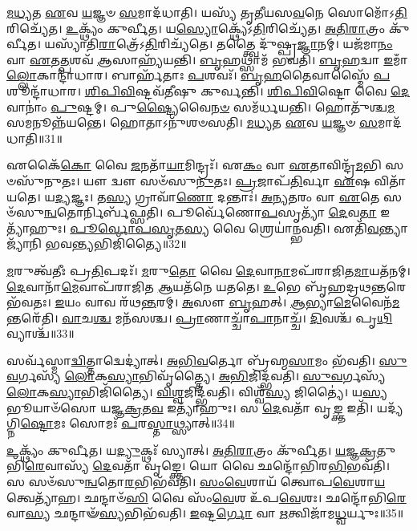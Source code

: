 \-\ul{𑌮}\-\-\ul{𑌧𑍍𑌯}\-𑌤 \ul{𑌏}\-𑌵 \ul{𑌯}\-𑌜𑍍𑌞𑍞 \ul{𑌸}\-𑌮𑌾𑌦᳴𑌧𑌾𑌤𑌿।
𑌯𑌸𑍍𑌯᳴ 𑌤𑍃𑌤𑍀𑌯𑌸\-\ul{𑌵}\-𑌨𑍇 𑌸𑍋𑌮𑍋᳴\-𑌽\-\ul{𑌤𑌿}\-𑌰𑌿𑌚𑍍𑌯𑍇᳴𑌤।
\-\ul{𑌉}\-𑌕𑍍𑌥𑍍𑌯𑌂᳴ 𑌕𑍁𑌰𑍍𑌵𑍀𑌤।
𑌯\-\ul{𑌸𑍍𑌯𑍋}\-𑌕𑍍𑌥𑍍𑌯𑍇᳴\-𑌽\-\ul{𑌤𑌿}\-𑌰𑌿𑌚𑍍𑌯𑍇᳴𑌤।
\-\ul{𑌅}\-\-\ul{𑌤𑌿}\-\-\ul{𑌰𑌾}\-𑌤𑍍𑌰𑌂 𑌕𑍁᳴𑌰𑍍𑌵𑍀𑌤।
𑌯𑌸𑍍𑌯𑌾᳴𑌤𑌿\-\ul{𑌰𑌾}\-𑌤𑍍𑌰𑍇᳴\-𑌽\-\ul{𑌤𑌿}\-𑌰𑌿𑌚𑍍𑌯᳴𑌤𑍇।
𑌤𑌤𑍍𑌤𑍍𑌵𑍈 𑌦𑍁᳴𑌷𑍍𑌪𑍍𑌰\-\ul{𑌜𑍍𑌞𑌾}\-𑌨𑌮𑍍।
𑌯𑌜᳴𑌮𑌾\-\ul{𑌨𑌂} 𑌵𑌾 \ul{𑌏}\-𑌤\-\ul{𑌤𑍍𑌪}\-𑌶𑌵᳴ \ul{𑌆}\-𑌸𑌾𑌹𑍍𑌯᳴𑌯𑌨𑍍𑌤𑌿।
\-\ul{𑌬𑍃}\-𑌹𑌥𑍍𑌸𑌾𑌮᳴ 𑌭𑌵𑌤𑌿।
\-\ul{𑌬𑍃}\-𑌹𑌦𑍍𑌵𑌾 \ul{𑌇}\-𑌮𑌾𑌁\-\ul{𑌲𑍍𑌲𑍋}\-𑌕𑌾𑌨𑍍𑌦𑌾᳴𑌧𑌾𑌰।
𑌬𑌾𑌰𑍍\mbox{}𑌹᳴𑌤𑌾𑌃 \ul{𑌪}\-𑌶𑌵𑌃᳴।
\-\ul{𑌬𑍃}\-\-\ul{𑌹}\-𑌤𑍈𑌵𑌾𑌸𑍍𑌮𑍈᳴ \ul{𑌪}\-𑌶𑍂𑌨𑍍𑌦𑌾᳴𑌧𑌾𑌰।
\-\ul{𑌶𑌿}\-\-\ul{𑌪𑌿}\-\-\ul{𑌵𑌿}\-𑌷𑍍𑌟𑌵᳴𑌤𑍀𑌷𑍁 𑌕𑍁𑌰𑍍𑌵𑌨𑍍𑌤𑌿।
\-\ul{𑌶𑌿}\-\-\ul{𑌪𑌿}\-\-\ul{𑌵𑌿}\-𑌷𑍍𑌟𑍋 𑌵𑍈 \ul{𑌦𑍇}\-𑌵𑌾𑌨𑌾𑌂॑ \ul{𑌪𑍁}\-𑌷𑍍𑌟𑌮𑍍।
𑌪𑍁\-\ul{𑌷𑍍𑌟𑍍𑌯𑍈}\-𑌵𑍈\-\ul{𑌨}\-\-\ul{𑍞} 𑌸𑌮᳴𑌰𑍍𑌧𑌯𑌨𑍍𑌤𑌿।
𑌹𑍋𑌤𑍁᳴𑌶𑍍𑌚\-\ul{𑌮}\-𑌸𑌮𑌨𑍂𑌨𑍍𑌨᳴𑌯𑌨𑍍𑌤𑍇।
𑌹𑍋𑌤𑌾𑌽𑌨𑍁᳴𑌶𑍞𑌸𑌤𑌿।
\-\ul{𑌮}\-\-\ul{𑌧𑍍𑌯}\-𑌤 \ul{𑌏}\-𑌵 \ul{𑌯}\-𑌜𑍍𑌞𑍞 \ul{𑌸}\-𑌮𑌾𑌦᳴𑌧𑌾𑌤𑌿॥31॥\anuvakamend[\-\ul{𑌯}\-\-\ul{𑌨𑍍𑌤𑌿} 𑌸𑌵᳴𑌨𑌸𑍍𑌯𑌾\-\ul{𑌤𑌿}\-𑌰𑌿𑌚𑍍𑌯᳴𑌤𑍇 𑌶𑍞𑌸𑌤𑌿 𑌦𑌾𑌧𑌾\-\ul{𑌰𑌾}\-𑌷𑍍𑌟𑍗 𑌚᳴]

𑌏𑌕𑍈᳴\-\ul{𑌕𑍋} 𑌵𑍈 \ul{𑌜}\-𑌨𑌤𑌾᳴\-\ul{𑌯𑌾}\-𑌮𑌿𑌨𑍍𑌦𑍍𑌰𑌃᳴।
𑌏\-\ul{𑌕𑌂} 𑌵𑌾 \ul{𑌏}\-𑌤𑌾𑌵𑌿𑌨𑍍𑌦𑍍𑌰᳴\-\ul{𑌮}\-𑌭𑌿 𑌸𑍞𑌸𑍁᳴𑌨𑍁𑌤𑌃।
𑌯𑍗 𑌦𑍍𑌵𑍗 𑌸𑍞᳴𑌸𑍁\-\ul{𑌨𑍁}\-𑌤𑌃।
\-\ul{𑌪𑍍𑌰}\-𑌜𑌾𑌪᳴\-\ul{𑌤𑌿}\-𑌰𑍍𑌵𑌾 \ul{𑌏}\-𑌷 𑌵𑌿𑌤𑌾᳴𑌯𑌤𑍇।
𑌯\-\ul{𑌦𑍍𑌯}\-𑌜𑍍𑌞𑌃।
𑌤\-\ul{𑌸𑍍𑌯} 𑌗𑍍𑌰𑌾𑌵𑌾᳴\-\ul{𑌣𑍋} 𑌦𑌨𑍍𑌤𑌾𑌃॑।
\-\ul{𑌅}\-\-\ul{𑌨𑍍𑌯}\-\-\ul{𑌤}\-𑌰𑌂 𑌵𑌾 \ul{𑌏}\-𑌤𑍇 𑌸𑍞᳴𑌸𑍁\-\ul{𑌨𑍍𑌵}\-𑌤𑍋𑌰𑍍𑌨𑌿𑌰𑍍𑌬᳴𑌫𑍍𑌸𑌤𑌿।
𑌪𑍂𑌰𑍍𑌵𑍇᳴𑌣𑍋\-\ul{𑌪}\-𑌸𑍃𑌤𑍍𑌯𑌾᳴ \ul{𑌦𑍇}\-𑌵\-\ul{𑌤𑌾} 𑌇𑌤𑍍𑌯𑌾᳴𑌹𑍁𑌃।
\-\ul{𑌪𑍂}\-\-\ul{𑌰𑍍𑌵𑍋}\-\-\ul{𑌪}\-\-\ul{𑌸𑍃}\-𑌤\-\ul{𑌸𑍍𑌯} 𑌵𑍈 𑌶𑍍𑌰𑍇𑌯𑌾॑𑌨𑍍𑌭𑌵𑌤𑌿।
𑌏𑌤𑌿᳴\-\ul{𑌵}\-𑌨𑍍𑌤𑍍𑌯𑌾𑌜𑍍𑌯𑌾᳴𑌨𑌿 𑌭𑌵\-\ul{𑌨𑍍𑌤𑍍𑌯}\-𑌭𑌿𑌜𑌿᳴𑌤𑍍𑌯𑍈॥32॥

\-\ul{𑌮}\-𑌰𑍁𑌤𑍍𑌵᳴𑌤𑍀𑌃 𑌪𑍍𑌰\-\ul{𑌤𑌿}\-𑌪𑌦𑌃᳴।
\-\ul{𑌮}\-𑌰𑍁\-\ul{𑌤𑍋} 𑌵𑍈 \ul{𑌦𑍇}\-𑌵𑌾\-\ul{𑌨𑌾}\-𑌮𑌪᳴𑌰𑌾𑌜𑌿𑌤\-\ul{𑌮𑌾}\-𑌯𑌤᳴𑌨𑌮𑍍।
\-\ul{𑌦𑍇}\-𑌵𑌾𑌨𑌾᳴\-\ul{𑌮𑍇}\-𑌵𑌾𑌪᳴𑌰𑌾𑌜𑌿𑌤 \ul{𑌆}\-𑌯𑌤᳴𑌨𑍇 𑌯𑌤𑌤𑍇।
\-\ul{𑌉}\-𑌭𑍇 𑌬𑍃᳴𑌹𑌦𑍍𑌰𑌥\-\ul{𑌨𑍍𑌤}\-𑌰𑍇 𑌭᳴𑌵𑌤𑌃।
\-\ul{𑌇}\-𑌯𑌂 𑌵𑌾𑌵 𑌰᳴𑌥\-\ul{𑌨𑍍𑌤}\-𑌰𑌮𑍍।
\-\ul{𑌅}\-𑌸𑍗 \ul{𑌬𑍃}\-𑌹𑌤𑍍।
\-\ul{𑌆}\-𑌭𑍍𑌯𑌾\-\ul{𑌮𑍇}\-𑌵𑍈𑌨᳴\-\ul{𑌮}\-𑌨𑍍𑌤𑌰𑍇᳴𑌤𑌿।
\-\ul{𑌵𑌾}\-𑌚\-\ul{𑌶𑍍𑌚} 𑌮𑌨᳴𑌸𑌶𑍍𑌚।
\-\ul{𑌪𑍍𑌰𑌾}\-𑌣𑌾𑌚𑍍𑌚𑌾᳴\-\ul{𑌪𑌾}\-𑌨𑌾𑌚𑍍𑌚᳴।
\-\ul{𑌦𑌿}\-𑌵𑌶𑍍𑌚᳴ 𑌪𑍃\-\ul{𑌥𑌿}\-𑌵𑍍𑌯𑌾𑌶𑍍𑌚᳴॥33॥

𑌸𑌰𑍍𑌵᳴𑌸𑍍𑌮𑌾\-\ul{𑌦𑍍𑌵𑌿}\-𑌤𑍍𑌤𑌾𑌦𑍍𑌵𑍇𑌦𑍍𑌯𑌾॑𑌤𑍍।
\-\ul{𑌅}\-\-\ul{𑌭𑌿}\-\-\ul{𑌵}\-𑌰𑍍𑌤𑍋 𑌬𑍍𑌰᳴𑌹𑍍𑌮\-\ul{𑌸𑌾}\-𑌮𑌂 𑌭᳴𑌵𑌤𑌿।
\-\ul{𑌸𑍁}\-\-\ul{𑌵}\-𑌰𑍍𑌗𑌸𑍍𑌯᳴ \ul{𑌲𑍋}\-𑌕\-\ul{𑌸𑍍𑌯𑌾}\-𑌭𑌿𑌵𑍃᳴𑌤𑍍𑌤𑍍𑌯𑍈।
\-\ul{𑌅}\-\-\ul{𑌭𑌿}\-𑌜𑌿𑌦𑍍𑌭᳴𑌵𑌤𑌿।
\-\ul{𑌸𑍁}\-\-\ul{𑌵}\-𑌰𑍍𑌗𑌸𑍍𑌯᳴ \ul{𑌲𑍋}\-𑌕\-\ul{𑌸𑍍𑌯𑌾}\-𑌭𑌿𑌜𑌿᳴𑌤𑍍𑌯𑍈।
\-\ul{𑌵𑌿}\-\-\ul{𑌶𑍍𑌵}\-𑌜𑌿𑌦𑍍𑌭᳴𑌵𑌤𑌿।
𑌵𑌿𑌶𑍍𑌵᳴\-\ul{𑌸𑍍𑌯} 𑌜𑌿𑌤𑍍𑌯𑍈॑।
𑌯\-\ul{𑌸𑍍𑌯} 𑌭𑍂𑌯𑌾𑍞᳴𑌸𑍋 𑌯𑌜𑍍𑌞\-\ul{𑌕𑍍𑌰}\-𑌤\-\ul{𑌵} 𑌇𑌤𑍍𑌯𑌾᳴𑌹𑍁𑌃।
𑌸 \ul{𑌦𑍇}\-𑌵𑌤𑌾᳴ 𑌵𑍃\-\ul{𑌙𑍍𑌕𑍍𑌤} 𑌇𑌤𑌿᳴।
𑌯𑌦𑍍𑌯᳴𑌗𑍍𑌨𑌿\-\ul{𑌷𑍍𑌟𑍋}\-𑌮𑌃 𑌸𑍋𑌮𑌃᳴ \ul{𑌪}\-𑌰\-\ul{𑌸𑍍𑌤𑌾}\-𑌥𑍍𑌸𑍍𑌯𑌾𑌤𑍍॥34॥

\-\ul{𑌉}\-𑌕𑍍𑌥𑍍𑌯𑌂᳴ 𑌕𑍁𑌰𑍍𑌵𑍀𑌤।
𑌯\-\ul{𑌦𑍍𑌯𑍁}\-𑌕𑍍𑌥𑌃᳴ 𑌸𑍍𑌯𑌾𑌤𑍍।
\-\ul{𑌅}\-\-\ul{𑌤𑌿}\-\-\ul{𑌰𑌾}\-𑌤𑍍𑌰𑌂 𑌕𑍁᳴𑌰𑍍𑌵𑍀𑌤।
\-\ul{𑌯}\-\-\ul{𑌜𑍍𑌞}\-\-\ul{𑌕𑍍𑌰}\-𑌤𑍁𑌭𑌿᳴\-\ul{𑌰𑍇}\-𑌵𑌾𑌸𑍍𑌯᳴ \ul{𑌦𑍇}\-𑌵𑌤𑌾᳴ 𑌵𑍃𑌙𑍍𑌕𑍍𑌤𑍇।
𑌯𑍋 𑌵𑍈 𑌛𑌨𑍍𑌦𑍋᳴𑌭𑌿𑌰\-\ul{𑌭𑌿}\-𑌭𑌵᳴𑌤𑌿।
𑌸 𑌸𑍞᳴𑌸𑍁\-\ul{𑌨𑍍𑌵}\-𑌤𑍋\-\ul{𑌰}\-𑌭𑌿𑌭᳴𑌵𑌤𑌿।
\-\ul{𑌸𑌂}\-\-\ul{𑌵𑍇}\-𑌶𑌾𑌯᳴ 𑌤𑍍𑌵𑍋𑌪\-\ul{𑌵𑍇}\-𑌶𑌾\-\ul{𑌯} 𑌤𑍍𑌵𑍇𑌤𑍍𑌯𑌾᳴𑌹।
𑌛𑌨𑍍𑌦𑌾𑍞᳴\-\ul{𑌸𑌿} 𑌵𑍈 𑌸𑌂᳴\-\ul{𑌵𑍇}\-𑌶 𑌉᳴𑌪\-\ul{𑌵𑍇}\-𑌶𑌃।
𑌛𑌨𑍍𑌦𑍋᳴𑌭𑌿\-\ul{𑌰𑍇}\-𑌵𑌾\-\ul{𑌸𑍍𑌯} 𑌛𑌨𑍍𑌦𑌾𑍟᳴\-\ul{𑌸𑍍𑌯}\-𑌭𑌿𑌭᳴𑌵𑌤𑌿।
\-\ul{𑌇}\-𑌷𑍍𑌟\-\ul{𑌰𑍍𑌗𑍋} 𑌵𑌾 \ul{𑌋}\-𑌤𑍍𑌵𑌿𑌜𑌾᳴𑌮\-\ul{𑌧𑍍𑌵}\-𑌰𑍍𑌯𑍁𑌃॥35॥

